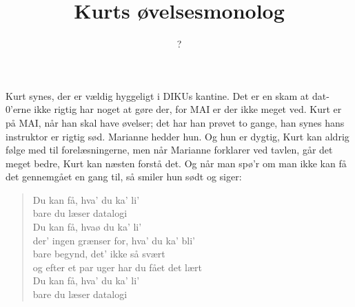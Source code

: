 \documentclass[a4paper,11pt]{article}
\title{Kurts øvelsesmonolog}
\author{?}
\begin{document}
\maketitle

\begin{sketch}

Kurt synes, der er vældig hyggeligt i DIKUs kantine. Det er en skam at dat-0'erne ikke rigtig har noget at gøre der, for MAI er der ikke meget ved. Kurt er på MAI, når han skal have øvelser; det har han prøvet to gange, han synes hans instruktor er rigtig sød. Marianne hedder hun. Og hun er dygtig, Kurt kan aldrig følge med til forelæsningerne, men når Marianne forklarer ved tavlen, går det meget bedre, Kurt kan næsten forstå det. Og når man spø'r om man ikke kan få det gennemgået en gang til, så smiler hun sødt og siger:

\begin{quote}
    Du kan få, hva' du ka' li' \\
    bare du læser datalogi \\
    Du kan få, hvaø du ka' li' \\
    der' ingen grænser for, hva' du ka' bli' \\
    bare begynd, det' ikke så svært \\
    og efter et par uger har du fået det lært \\
    Du kan få, hva' du ka' li' \\
    bare du læser datalogi 
\end{quote}

\end{sketch}
\end{document}
